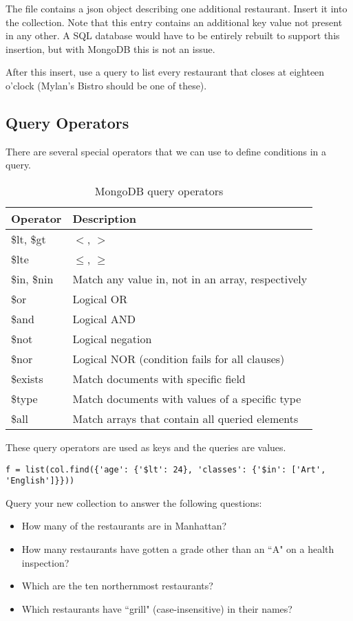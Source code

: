 \begin{problem}
The file  contains a json object describing one additional restaurant.  Insert it into the collection. Note that this entry contains an additional key value not present in any other.  A SQL database would have to be entirely rebuilt to support this insertion, but with MongoDB this is not an issue.

After this insert, use a query to list every restaurant that closes at eighteen o'clock (Mylan's Bistro should be one of these).
\end{problem}

\subsection*{Query Operators}
There are several special operators that we can use to define conditions in a query.
\begin{table}
\begin{tabular}{|l|l|}
\hline
Operator & Description \\
\hline
\$lt, \$gt & $<$, $>$ \\
\$lte & $\leq$, $\geq$ \\
\$in, \$nin & Match any value in, not in an array, respectively \\
\hline
\$or & Logical OR \\
\$and & Logical AND \\
\$not & Logical negation \\
\$nor & Logical NOR (condition fails for all clauses) \\
\hline
\$exists & Match documents with specific field \\
\$type & Match documents with values of a specific type \\
\hline
\$all & Match arrays that contain all queried elements \\
\hline
\end{tabular}
\caption{MongoDB query operators}
\label{table:queryoperators}
\end{table}
These query operators are used as keys and the queries are values.
\begin{lstlisting}
f = list(col.find({'age': {'$lt': 24}, 'classes': {'$in': ['Art', 'English']}}))
\end{lstlisting}

\begin{problem}
Query your new collection to answer the following questions:
\begin{itemize}
\item How many of the restaurants are in Manhattan?
\item How many restaurants have gotten a grade other than an ``A" on a health inspection?
\item Which are the ten northernmost restaurants?
\item Which restaurants have ``grill" (case-insensitive) in their names?
\end{itemize}
\end{problem}


